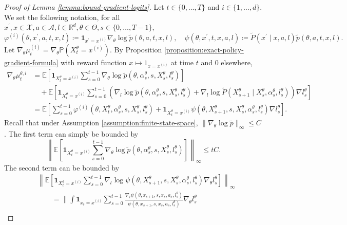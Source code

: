 \documentclass[11pt]{article}
\numberwithin{equation}{section}
\theoremstyle{definition}
\theoremstyle{remark}
\def\cA{\mathcal{A}}
\def\cX{\mathcal{X}}
\def\P{\mathbb{P}}
\def\R{{\mathbb R}}
\begin{document}
\begin{proof}[Proof of Lemma \ref{lemma:bound-gradient-logits}]
    Let $t \in \{0, \ldots, T\}$ and $i \in \{1, \ldots, d\}$.
    We set the following notation, for all $x^\prime,x \in \cX, a \in \cA, l \in \R^d, \theta \in \Theta, s \in \{0, \ldots, T-1\}$,
    \[
    \varphi^{(i)}(\theta, x^\prime, a, t,x, l) \coloneq \mathbf 1_{x^\prime = x^{(i)}} \nabla_\theta \log \tilde p (\theta, a, t,x, l), \quad  \psi(\theta, x^\prime, t,x, a, l) \coloneq \tilde P (x^\prime \mid x, a, l) \tilde p (\theta, a, t,x, l). 
    \]
    Let $\nabla_\theta \mu_t^{(i)} = \nabla_\theta \P(X_t^\theta = x^{(i)})$. By Proposition \ref{proposition:exact-policy-gradient-formula} with reward function $x \mapsto 1_{x = x^{(i)}}$ at time $t$ and $0$ elsewhere, 
    \[
    \begin{aligned}
    \nabla_\theta \mu_t^{\theta, i} &= \mathbb E \left[
        \mathbf 1_{X_t^\theta = x^{(i)}} \sum_{s = 0}^{t-1} \nabla_\theta \log \tilde p (\theta, \alpha_s^\theta, s,X_s^\theta, l_s^\theta) \right] \\
      & \quad  + \mathbb E \left[\mathbf 1_{X_t^\theta = x^{(i)}} \sum_{s=0}^{t-1} \left(\nabla_l \log \tilde p (\theta, \alpha_s^\theta, s,X_s^\theta, l_s^\theta) + \nabla_l \log \tilde P (X_{s + 1}^\theta \mid X_s^\theta, \alpha_s^\theta, l_s^\theta)\right) \nabla l_s^\theta  \right]\\
     &= \mathbb E \left[ \sum_{s=0}^{t-1} \varphi^{(i)}(\theta, X_t^\theta, \alpha_s^\theta, s,X_s^\theta, l_s^\theta) + \mathbf 1_{X_t^\theta = x^{(i)}}\psi(\theta, X_{s+1}^\theta, s,X_s^\theta, \alpha_s^\theta, l_s^\theta) \nabla l_s^\theta \right].
    \end{aligned}
    \]
    Recall that under Assumption \ref{assumption:finite-state-space}, $ \|\nabla_\theta \log \tilde p \|_\infty \leq C $. The first term can simply be bounded by 
    \[
    \left\| \mathbb E \left[ \mathbf 1_{X_t^\theta = x^{(i)}} \sum_{s=0}^{t-1} \nabla_\theta \log \tilde p (\theta, \alpha_s^\theta, s,X_s^\theta, l_s^\theta) \right]  \right\|_\infty \leq t C.
    \]
    The second term can be bounded by
    \[
\begin{aligned}
    &\left\| \mathbb E \left[ \mathbf 1_{X_t^\theta = x^{(i)}} \sum_{s=0}^{t-1}\nabla_l \log \psi(\theta, X_{s + 1}^\theta, s,X_s^\theta, \alpha_s^\theta, l_s^\theta) \nabla_\theta l_s^\theta \right] \right\|_\infty \\
    &\qquad = \Bigg\| \int \mathbf 1_{x_t = x^{(i)}} \sum_{s=0}^{t-1}\frac{\nabla_l \psi(\theta, x_{s + 1}, s,x_s, a_s, l_s^\theta)}{\psi(\theta, x_{s+1}, s,x_s, a_s, l_s^\theta)} \nabla_\theta l_s^\theta \\

\end{aligned}\]
\end{proof}
\end{document}
